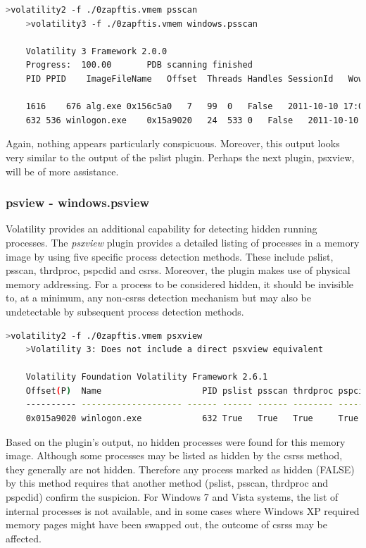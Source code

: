 \begin{lstlisting}[language=bash]
    >volatility2 -f ./0zapftis.vmem psscan
    >volatility3 -f ./0zapftis.vmem windows.psscan

    Volatility 3 Framework 2.0.0
    Progress:  100.00		PDB scanning finished
    PID	PPID	ImageFileName	Offset	Threads	Handles	SessionId	Wow64	CreateTime	ExitTime	File output

    1616	676	alg.exe	0x156c5a0	7	99	0	False	2011-10-10 17:04:01.000000 	N/A	Disabled
    632	536	winlogon.exe	0x15a9020	24	533	0	False	2011-10-10 17:03:58.000000 	N/A	Disabled
\end{lstlisting}

Again, nothing appears particularly conspicuous. Moreover, this output looks very similar to the output of the pslist plugin. Perhaps the next plugin, psxview, will be of more assistance.

\subsubsection{psview - windows.psview}
Volatility provides an additional capability for detecting hidden running processes. The \textit{psxview} plugin provides a detailed listing of processes in a memory image by using five specific process detection methods. These include pslist, psscan, thrdproc, pspcdid and csrss. Moreover, the plugin makes use of physical memory addressing. For a process to be considered hidden, it should be invisible to, at a minimum, any non-csrss detection mechanism but may also be undetectable by subsequent process detection methods.

\begin{lstlisting}[language=bash]
    >volatility2 -f ./0zapftis.vmem psxview
    >Volatility 3: Does not include a direct psxview equivalent

    Volatility Foundation Volatility Framework 2.6.1
    Offset(P)  Name                    PID pslist psscan thrdproc pspcid csrss session deskthrd ExitTime
    ---------- -------------------- ------ ------ ------ -------- ------ ----- ------- -------- --------
    0x015a9020 winlogon.exe            632 True   True   True     True   True  True    True
\end{lstlisting}

Based on the plugin's output, no hidden processes were found for this memory image. Although some processes may be listed as hidden by the csrss method, they generally are not hidden. Therefore any process marked as hidden (FALSE) by this method requires that another method (pslist, psscan, thrdproc and pspcdid) confirm the suspicion. For Windows 7 and Vista systems, the list of internal processes is not available, and in some cases where Windows XP required memory pages might have been swapped out, the outcome of csrss may be affected.


